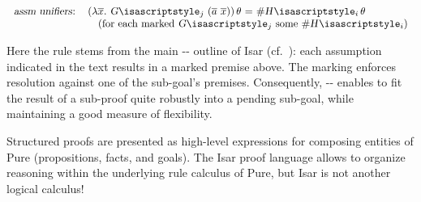 \begin{isabellebody}
\begin{isamarkuptext}
\[{\begin{tabular}{rl}
    \isa{{\isaliteral{22}{\isachardoublequote}}assm\ unifiers{\isaliteral{3A}{\isacharcolon}}{\isaliteral{22}{\isachardoublequote}}} &
    \isa{{\isaliteral{22}{\isachardoublequote}}{\isaliteral{28}{\isacharparenleft}}{\isaliteral{5C3C6C616D6264613E}{\isasymlambda}}\isaliteral{5C3C5E7665633E}{}\isactrlvec x{\isaliteral{2E}{\isachardot}}\ G\isaliteral{5C3C5E7375623E}{}\isactrlsub j\ {\isaliteral{28}{\isacharparenleft}}\isaliteral{5C3C5E7665633E}{}\isactrlvec a\ \isaliteral{5C3C5E7665633E}{}\isactrlvec x{\isaliteral{29}{\isacharparenright}}{\isaliteral{29}{\isacharparenright}}{\isaliteral{5C3C76617274686574613E}{\isasymvartheta}}\ {\isaliteral{3D}{\isacharequal}}\ {\isaliteral{23}{\isacharhash}}H\isaliteral{5C3C5E7375623E}{}\isactrlsub i{\isaliteral{5C3C76617274686574613E}{\isasymvartheta}}{\isaliteral{22}{\isachardoublequote}}} \\
    & \quad (for each marked \isa{{\isaliteral{22}{\isachardoublequote}}G\isaliteral{5C3C5E7375623E}{}\isactrlsub j{\isaliteral{22}{\isachardoublequote}}} some \isa{{\isaliteral{22}{\isachardoublequote}}{\isaliteral{23}{\isacharhash}}H\isaliteral{5C3C5E7375623E}{}\isactrlsub i{\isaliteral{22}{\isachardoublequote}}}) \\
   \end{tabular}}
  \]

  \noindent Here the  rule stems from the
  main \hyperlink{command.fix}{\mbox{}}-\hyperlink{command.assume}{\mbox{}}-\hyperlink{command.show}{\mbox{}} outline of
  Isar (cf.\ ): each assumption
  indicated in the text results in a marked premise  above.
  The marking enforces resolution against one of the sub-goal's
  premises.  Consequently, \hyperlink{command.fix}{\mbox{}}-\hyperlink{command.assume}{\mbox{}}-\hyperlink{command.show}{\mbox{}} enables to fit the result of a sub-proof quite robustly into a
  pending sub-goal, while maintaining a good measure of flexibility.%
\end{isamarkuptext}%
\isamarkuptrue%
%
\isamarkuptrue%
%
\begin{isamarkuptext}%
Structured proofs are presented as high-level expressions for
  composing entities of Pure (propositions, facts, and goals).  The
  Isar proof language allows to organize reasoning within the
  underlying rule calculus of Pure, but Isar is not another logical
  calculus!


\end{isamarkuptext}
\end{isabellebody}
